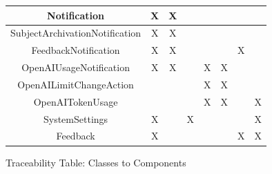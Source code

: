 \documentclass[
    english, %
]{VUMIFPSkursinis}
\begin{document}
\begin{figure}[ht]
\begin{tabular}{|c|c|c|c|c|c|c|c|}
        \hline
        Notification                   & X            & X                   &           &           &           &           &           \\
        \hline
        SubjectArchivationNotification & X            & X                   &           &           &           &           &           \\
        \hline
        FeedbackNotification           & X            & X                   &           &           &           & X         &           \\
        \hline
        OpenAIUsageNotification        & X            & X                   &           & X         & X         &           &           \\
        \hline
        OpenAILimitChangeAction        &              &                     &           & X         & X         &           &           \\
        \hline
        OpenAITokenUsage               &              &                     &           & X         & X         &           & X         \\
        \hline
        SystemSettings                 & X            &                     & X         &           &           &           & X         \\
        \hline
        Feedback                       & X            &                     &           &           &           & X         & X         \\
        \hline
    \end{tabular}
    \caption{Traceability Table: Classes to Components}
\end{figure}

\clearpage
\end{document}
